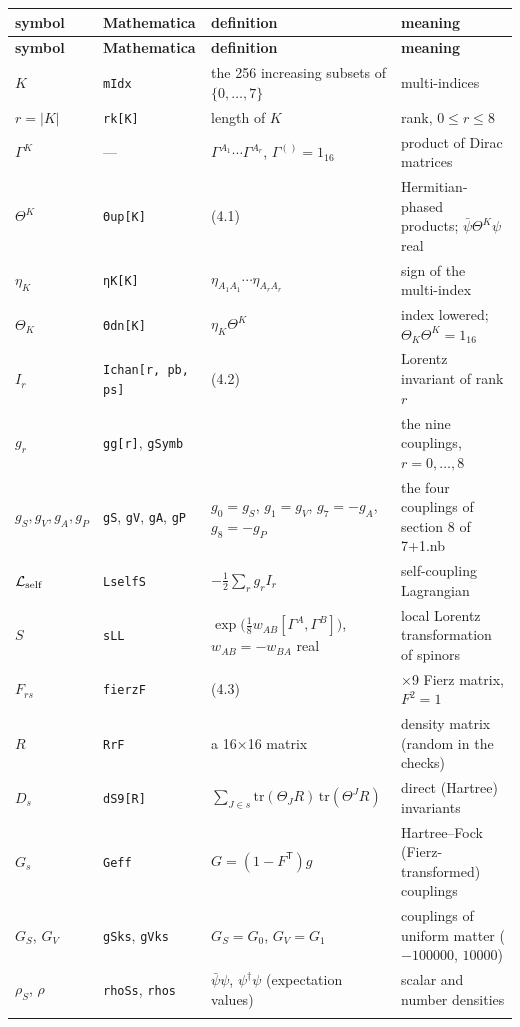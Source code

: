 \documentclass[10pt,a4paper]{article}
\begin{document}
{\small
\begin{longtable}{>{\raggedright\arraybackslash}p{}>{\raggedright\arraybackslash}p{}>{\raggedright\arraybackslash}p{}>{\raggedright\arraybackslash}p{}}
\toprule
\textbf{symbol} & \textbf{Mathematica} & \textbf{definition} & \textbf{meaning} \\
\midrule\endfirsthead
\toprule
\textbf{symbol} & \textbf{Mathematica} & \textbf{definition} & \textbf{meaning} \\
\midrule\endhead
\endfoot
\bottomrule\endlastfoot
$K$ & \texttt{mIdx} & the 256 increasing subsets of $\lbrace0,\dots,7\rbrace$ & multi-indices \\
$r=|K|$ & \texttt{rk[K]} & length of $K$ & rank, $0\le r\le8$ \\
$\Gamma^K$ & — & $\Gamma^{A_1}\cdots\Gamma^{A_r}$, $\Gamma^{()}=1_{16}$ & product of Dirac matrices \\
$\Theta^K$ & \texttt{Θup[K]} & (4.1) & Hermitian-phased products; $\bar\psi\Theta^K\psi$ real \\
$\eta_K$ & \texttt{ηK[K]} & $\eta_{A_1A_1}\cdots\eta_{A_rA_r}$ & sign of the multi-index \\
$\Theta_K$ & \texttt{Θdn[K]} & $\eta_K\Theta^K$ & index lowered; $\Theta_K\Theta^K=1_{16}$ \\
$I_r$ & \texttt{Ichan[r, pb, ps]} & (4.2) & Lorentz invariant of rank $r$ \\
$g_r$ & \texttt{gg[r]}, \texttt{gSymb} &  & the nine couplings, $r=0,\dots,8$ \\
$g_S,g_V,g_A,g_P$ & \texttt{gS}, \texttt{gV}, \texttt{gA}, \texttt{gP} & $g_0=g_S$, $g_1=g_V$, $g_7=-g_A$, $g_8=-g_P$ & the four couplings of section 8 of 7+1.nb \\
$\mathcal L_{\rm self}$ & \texttt{LselfS} & $-\tfrac12\sum_rg_rI_r$ & self-coupling Lagrangian \\
$S$ & \texttt{sLL} & $\exp\big(\tfrac18w_{AB}[\Gamma^A,\Gamma^B]\big)$, $w_{AB}=-w_{BA}$ real & local Lorentz transformation of spinors \\
$F_{rs}$ & \texttt{fierzF} & (4.3) & 9×9 Fierz matrix, $F^2=1$ \\
$R$ & \texttt{RrF} & a 16×16 matrix & density matrix (random in the checks) \\
$D_s$ & \texttt{dS9[R]} & $\sum_{J\in s}\mathrm{tr}(\Theta_JR)\,\mathrm{tr}(\Theta^JR)$ & direct (Hartree) invariants \\
$G_s$ & \texttt{Geff} & $G=(1-F^{\mathsf T})g$ & Hartree–Fock (Fierz-transformed) couplings \\
$G_S$, $G_V$ & \texttt{gSks}, \texttt{gVks} & $G_S=G_0$, $G_V=G_1$ & couplings of uniform matter ($-100000$, $10000$) \\
$\rho_S$, $\rho$ & \texttt{rhoSs}, \texttt{rhos} & $\bar\psi\psi$, $\psi^\dagger\psi$ (expectation values) & scalar and number densities \\*
\end{longtable}}
\end{document}

